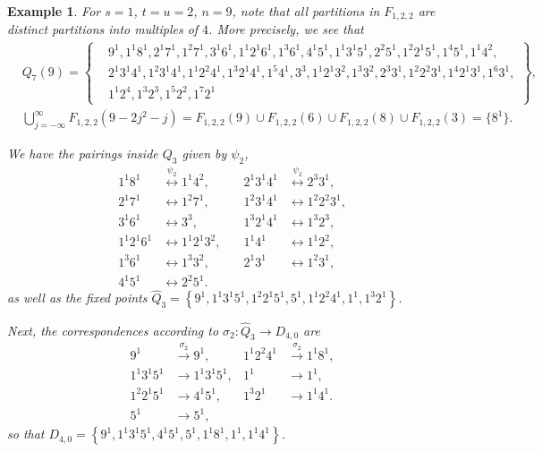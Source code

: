 \documentclass[12pt,reqno]{amsart}
\numberwithin{equation}{section}
\newtheorem{Example}{Example}[section]
\begin{document}
\begin{Example}
	For $s=1$, $t=u=2$, $n=9$, note that all partitions in $F_{1,2,2}$ are distinct partitions into multiples of $4$. More precisely, we see that
	\begin{align*}
	& Q_{7}(9)=\left\{
		\begin{aligned}
			& 9^{1}, 1^{1}8^{1}, 2^{1}7^{1}, 1^{2}7^{1}, 3^{1}6^{1}, 1^{1}2^{1}6^{1}, 1^{3}6^{1}, 4^{1}5^{1}, 1^{1}3^{1}5^{1}, 2^{2}5^{1}, 1^{2}2^{1}5^{1}, 1^{4}5^{1}, 1^{1}4^{2}, \\
			& 2^{1}3^{1}4^{1}, 1^{2}3^{1}4^{1}, 1^{1}2^{2}4^{1},1^{3}2^{1}4^{1}, 1^{5}4^{1}, 3^{3}, 1^{1}2^{1}3^{2}, 1^{3}3^{2}, 2^{3}3^{1},1^{2}2^{2}3^{1}, 1^{4}2^{1}3^{1}, 1^{6}3^{1}, \\
			& 1^{1}2^{4},1^{3}2^{3}, 1^{5}2^{2}, 1^{7}2^{1}
		\end{aligned}
		\right\},\\
	&\bigcup_{j=-\infty}^{\infty}F_{1,2,2}(9-2j^2-j)=F_{1,2,2}(9)\cup F_{1,2,2}(6)\cup F_{1,2,2}(8)\cup F_{1,2,2}(3) = \{8^{1}\}.
	\end{align*}
	
	We have the pairings inside $Q_3$ given by $\psi_{2}$,
	\begin{align*}
		1^{1}8^{1} &\overset{\psi_{2}}{\longleftrightarrow} 1^{1}4^{2}, &\quad 2^{1}3^{1}4^{1} &\overset{\psi_{2}}\longleftrightarrow 2^{3}3^{1},\\
		2^{1}7^{1} &\longleftrightarrow 1^{2}7^{1},&\quad 1^{2}3^{1}4^{1} &\longleftrightarrow 1^{2}2^{2}3^{1},\\
		3^{1}6^{1} &\longleftrightarrow 3^{3}, &\quad 1^{3}2^{1}4^{1} &\longleftrightarrow 1^{3}2^{3},\\
		1^{1}2^{1}6^{1} &\longleftrightarrow 1^{1}2^{1}3^{2}, &\quad 1^{1}4^{1} &\longleftrightarrow 1^{1}2^{2},\\
		1^{3}6^{1} &\longleftrightarrow 1^{3}3^{2}, &\quad 2^{1}3^{1} &\longleftrightarrow 1^{2}3^{1},\\
		4^{1}5^{1} &\longleftrightarrow 2^{2}5^{1}.
	\end{align*}
	as well as the fixed points $\hat{Q}_{3}=
	\left\{
	9^{1}, 1^{1}3^{1}5^{1}, 1^{2}2^{1}5^{1}, 5^{1}, 1^{1}2^{2}4^{1}, 1^{1}, 1^{3}2^{1}
	\right\}$.
	
	Next, the correspondences according to $\sigma_{2}:\hat{Q}_3\to D_{4,0}$ are
	\begin{align*}
		9^{1} &\overset{\sigma_{2}}{\longrightarrow} 9^{1}, & 1^{1}2^{2}4^{1} &\overset{\sigma_{2}}\longrightarrow 1^{1}8^{1},\\
		1^{1}3^{1}5^{1} &\longrightarrow 1^{1}3^{1}5^{1}, &1^{1} &\longrightarrow 1^{1},\\
		1^{2}2^{1}5^{1} &\longrightarrow 4^{1}5^{1},  &1^{3}2^{1} &\longrightarrow 1^{1}4^{1}.\\
		5^{1} &\longrightarrow 5^{1},
	\end{align*}
	so that $D_{4,0} =
	\left\{
	9^{1}, 1^{1}3^{1}5^{1}, 4^{1}5^{1}, 5^{1}, 1^{1}8^{1}, 1^{1}, 1^{1}4^{1}
	\right\}
	$.
	

\end{Example}
\end{document}
